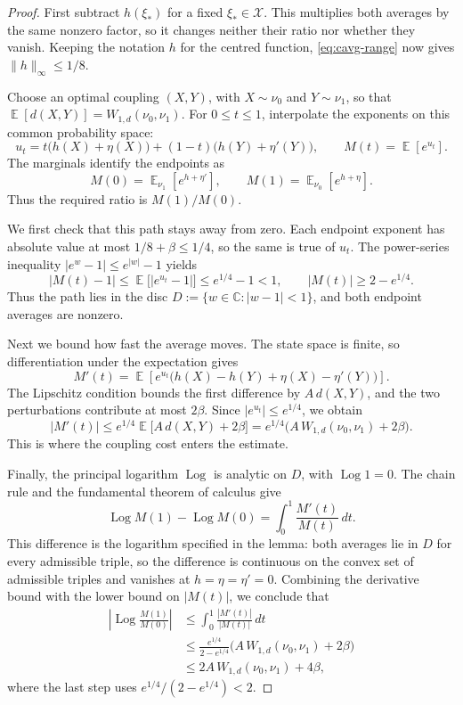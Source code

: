\documentclass[11pt,reqno]{article}
\theoremstyle{plain}
\theoremstyle{definition}
\theoremstyle{remark}
\theoremstyle{definition}
\theoremstyle{remark}
\newcommand{\C}{\mathbb{C}}
\newcommand{\Log}{\operatorname{Log}}          %
\DeclareMathOperator{\E}{\mathbb{E}}
\newcommand{\Wd}{W_{1,d}}                        %
\begin{document}
\begin{proof}
First subtract \(h(\xi_*)\) for a fixed \(\xi_*\in\mathcal X\).
This multiplies both averages by the same nonzero factor, so it changes
neither their ratio nor whether they vanish.  Keeping the notation \(h\)
for the centred function, \eqref{eq:cavg-range} now gives
\(\lVert h\rVert_\infty\le1/8\).

Choose an optimal coupling \((X,Y)\), with \(X\sim\nu_0\) and
\(Y\sim\nu_1\), so that
\(\E[d(X,Y)]=\Wd(\nu_0,\nu_1)\).  For \(0\le t\le1\), interpolate
the exponents on this common probability space:
\[
  u_t=t\bigl(h(X)+\eta(X)\bigr)
      +(1-t)\bigl(h(Y)+\eta'(Y)\bigr),
  \qquad M(t)=\E[e^{u_t}].
\]
The marginals identify the endpoints as
\[
  M(0)=\E_{\nu_1}[e^{h+\eta'}],
  \qquad M(1)=\E_{\nu_0}[e^{h+\eta}].
\]
Thus the required ratio is \(M(1)/M(0)\).

We first check that this path stays away from zero.  Each endpoint
exponent has absolute value at most \(1/8+\beta\le1/4\), so the same
is true of \(u_t\).  The power-series inequality
\(|e^w-1|\le e^{|w|}-1\) yields
\[
  |M(t)-1|\le\E\bigl[|e^{u_t}-1|\bigr]
      \le e^{1/4}-1<1,
  \qquad |M(t)|\ge2-e^{1/4}.
\]
Thus the path lies in the disc \(D:=\{w\in\C:|w-1|<1\}\), and both
endpoint averages are nonzero.

Next we bound how fast the average moves.  The state space is finite,
so differentiation under the expectation gives
\[
  M'(t)=\E\!\left[e^{u_t}
    \bigl(h(X)-h(Y)+\eta(X)-\eta'(Y)\bigr)\right].
\]
The Lipschitz condition bounds the first difference by \(A\,d(X,Y)\),
and the two perturbations contribute at most \(2\beta\).  Since
\(|e^{u_t}|\le e^{1/4}\), we obtain
\[
  |M'(t)|
  \le e^{1/4}\E\bigl[A\,d(X,Y)+2\beta\bigr]
  =e^{1/4}\bigl(A\,\Wd(\nu_0,\nu_1)+2\beta\bigr).
\]
This is where the coupling cost enters the estimate.

Finally, the principal logarithm \(\Log\) is analytic on \(D\), with
\(\Log1=0\).  The chain rule and the fundamental theorem of calculus give
\[
  \Log M(1)-\Log M(0)=\int_0^1\frac{M'(t)}{M(t)}\,dt.
\]
This difference is the logarithm specified in the lemma: both averages
lie in \(D\) for every admissible triple, so the difference is continuous
on the convex set of admissible triples and vanishes at
\(h=\eta=\eta'=0\).  Combining the derivative bound
with the lower bound on \(|M(t)|\), we conclude that
\[
\begin{aligned}
  \left|\Log\frac{M(1)}{M(0)}\right|
  &\le\int_0^1\frac{|M'(t)|}{|M(t)|}\,dt\\
  &\le\frac{e^{1/4}}{2-e^{1/4}}
       \bigl(A\,\Wd(\nu_0,\nu_1)+2\beta\bigr)\\
  &\le2A\,\Wd(\nu_0,\nu_1)+4\beta,
\end{aligned}
\]
where the last step uses \(e^{1/4}/(2-e^{1/4})<2\).
\end{proof}
\end{document}
